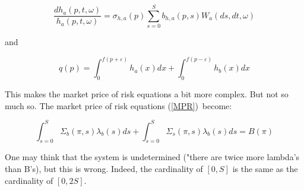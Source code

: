\documentclass{article}
\begin{document}
\begin{equation*}
\frac{dh_{a}(p,t,\omega )}{h_{a}(p,t,\omega )}=\sigma
_{h,a}(p)\sum_{s=0}^{S}b_{h,a}(p,s)W_{a}(ds,dt,\omega )
\end{equation*}

and

\begin{equation*}
q(p)=\int_{0}^{f(p+\varepsilon )}h_{a}(x)dx+\int_{0}^{f(p-\varepsilon
)}h_{b}(x)dx
\end{equation*}

This makes the market price of risk equations a bit more complex. But not so
much so. The market price of risk equations (\ref{MPR})\ become:

\begin{equation*}
\int_{s=0}^{S}\Sigma _{b}(\pi ,s)\lambda _{b}(s)ds+\int_{s=0}^{S}\Sigma
_{s}(\pi ,s)\lambda _{b}(s)ds=B(\pi )
\end{equation*}

One may think that the system is undetermined ("there are twice more
lambda's than B's), but this is wrong. Indeed, the cardinality of $[0,S]$ is
the same as the cardinality of $[0,2S].$
\end{document}

